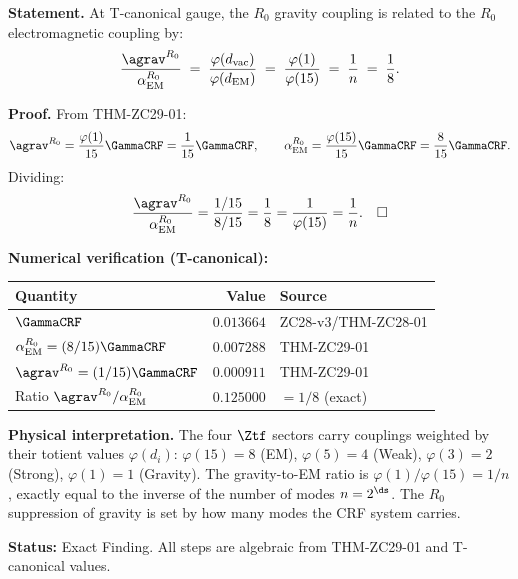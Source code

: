 \documentclass[12pt, a4paper]{article}
\renewcommand{\aEM}{\alpha_{\rm EM}}
\begin{document}
\begin{derivedbox}[title={FIND-ZC72-01: $\agrav^{R_0}/\aEM^{R_0} = 1/n$
  --- Exact Ratio from Key Identity ($R_0$, Exact)}]

\textbf{Statement.}
At T-canonical gauge, the $R_0$ gravity coupling is related
to the $R_0$ electromagnetic coupling by:
\begin{equation}
  \frac{\agrav^{R_0}}{\aEM^{R_0}}
  \;=\;
  \frac{\varphi(d_{\rm vac})}{\varphi(d_{\rm EM})}
  \;=\;
  \frac{\varphi(1)}{\varphi(15)}
  \;=\;
  \frac{1}{n}
  \;=\; \frac{1}{8}.
  \label{eq:ratio}
\end{equation}

\textbf{Proof.}
From THM-ZC29-01:
\[
  \agrav^{R_0} = \frac{\varphi(1)}{15}\GammaCRF = \frac{1}{15}\GammaCRF,
  \qquad
  \aEM^{R_0} = \frac{\varphi(15)}{15}\GammaCRF = \frac{8}{15}\GammaCRF.
\]
Dividing:
\[
  \frac{\agrav^{R_0}}{\aEM^{R_0}}
  = \frac{1/15}{8/15}
  = \frac{1}{8}
  = \frac{1}{\varphi(15)}
  = \frac{1}{n}. \quad\square
\]

\textbf{Numerical verification (T-canonical):}
\begin{center}
\renewcommand{\arraystretch}{1.25}
\begin{tabular}{@{}lrl@{}}
\toprule
Quantity & Value & Source \\
\midrule
$\GammaCRF$ & $0.013664$ & ZC28-v3/THM-ZC28-01 \\
$\aEM^{R_0} = (8/15)\GammaCRF$ & $0.007288$ & THM-ZC29-01 \\
$\agrav^{R_0} = (1/15)\GammaCRF$ & $0.000911$ & THM-ZC29-01 \\
Ratio $\agrav^{R_0}/\aEM^{R_0}$ & $0.125000$ & $= 1/8$ (exact) \\
\bottomrule
\end{tabular}
\end{center}

\textbf{Physical interpretation.}
The four $\Ztf$ sectors carry couplings weighted by their
totient values $\varphi(d_i)$:
$\varphi(15) = 8$ (EM), $\varphi(5) = 4$ (Weak),
$\varphi(3) = 2$ (Strong), $\varphi(1) = 1$ (Gravity).
The gravity-to-EM ratio is $\varphi(1)/\varphi(15) = 1/n$,
exactly equal to the inverse of the number of modes $n = 2^{\ds}$.
The $R_0$ suppression of gravity is set by how many modes
the CRF system carries.

\textbf{Status:} Exact Finding.
All steps are algebraic from THM-ZC29-01 and T-canonical values.
\end{derivedbox}

\end{document}
